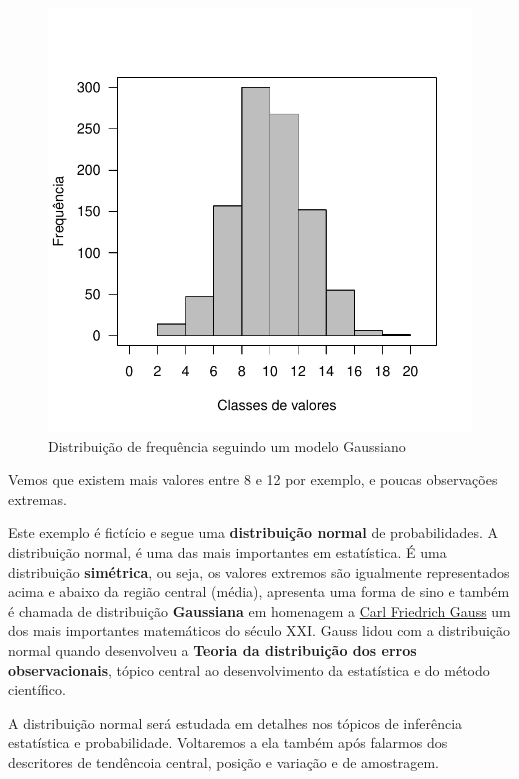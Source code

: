 \documentclass[
]{book}
\begin{document}
\begin{figure}

{\centering \includegraphics{probest-cambientais_files/figure-latex/distrfreq-1} 

}

\caption{Distribuição de frequência seguindo um modelo Gaussiano}\label{fig:distrfreq}
\end{figure}

Vemos que existem mais valores entre 8 e 12 por exemplo, e poucas observações extremas.

Este exemplo é fictício e segue uma \textbf{distribuição normal} de probabilidades. A distribuição normal, é uma das mais importantes em estatística. É uma distribuição \textbf{simétrica}, ou seja, os valores extremos são igualmente representados acima e abaixo da região central (média), apresenta uma forma de sino e também é chamada de distribuição \textbf{Gaussiana} em homenagem a \href{https://en.wikipedia.org/wiki/Carl_Friedrich_Gauss}{Carl Friedrich Gauss} um dos mais importantes matemáticos do século XXI. Gauss lidou com a distribuição normal quando desenvolveu a \textbf{Teoria da distribuição dos erros observacionais}, tópico central ao desenvolvimento da estatística e do método científico.

A distribuição normal será estudada em detalhes nos tópicos de inferência estatística e probabilidade. Voltaremos a ela também após falarmos dos descritores de tendêncoia central, posição e variação e de amostragem.
\end{document}
